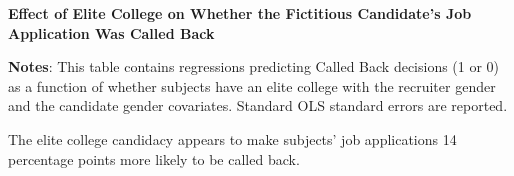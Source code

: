 \documentclass[11pt]{article}
\begin{document}
\begin{table}[htbp]
\caption{\textbf{Effect of Elite College on Whether the Fictitious Candidate's Job Application Was Called Back}
\label{tab:EngApproach}}
\flushleft
	
    \flushleft
    \begin{footnotesize}
    \textbf{Notes}: This table contains regressions predicting Called Back decisions (1 or 0) as a function of whether subjects have an elite college with the recruiter gender and the candidate gender covariates. Standard OLS standard errors are reported.  
    \end{footnotesize}
\end{table}

The elite college candidacy appears to make subjects’ job applications 14 percentage points more likely to be called back.
\end{document}
